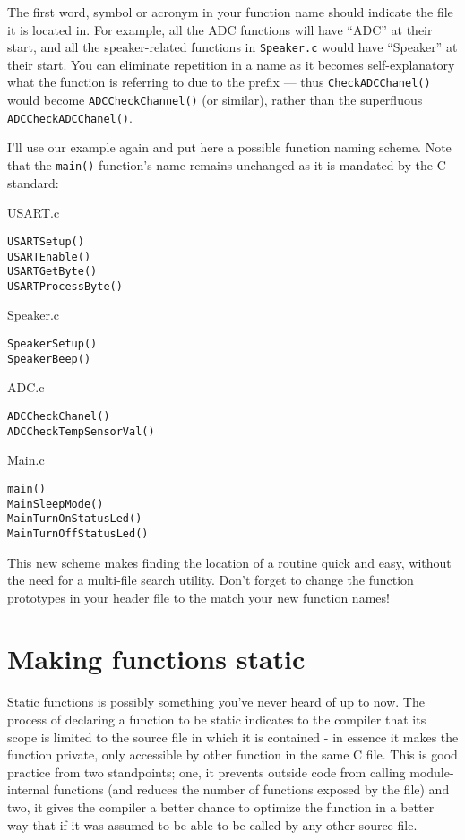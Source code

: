 \documentclass[a4paper,oneside]{book}
\begin{document}
The first word, symbol or acronym in your function name should indicate the file it is located in. For example, all the ADC functions will have ``ADC'' at their start, and all the speaker-related functions in \texttt{Speaker.c} would have ``Speaker'' at their start. You can eliminate repetition in a name as it becomes self-explanatory what the function is referring to due to the prefix --- thus \texttt{CheckADCChanel()} would become \texttt{ADCCheckChannel()} (or similar), rather than the superfluous \texttt{ADCCheckADCChanel()}.

I'll use our example again and put here a possible function naming scheme. Note that the \texttt{main()} function's name remains unchanged as it is mandated by the C standard:

USART.c
\begin{center}
\begin{lstlisting}
USARTSetup()
USARTEnable()
USARTGetByte()
USARTProcessByte()
\end{lstlisting}
\end{center}

Speaker.c
\begin{center}
\begin{lstlisting}
SpeakerSetup()
SpeakerBeep()
\end{lstlisting}
\end{center}

ADC.c
\begin{center}
\begin{lstlisting}
ADCCheckChanel()
ADCCheckTempSensorVal()
\end{lstlisting}
\end{center}

Main.c
\begin{center}
\begin{lstlisting}
main()
MainSleepMode()
MainTurnOnStatusLed()
MainTurnOffStatusLed()
\end{lstlisting}
\end{center}

This new scheme makes finding the location of a routine quick and easy, without the need for a multi-file search utility. Don't forget to change the function prototypes in your header file to the match your new function names!

\section{Making functions static}

Static functions is possibly something you've never heard of up to now. The process of declaring a function to be static indicates to the compiler that its scope is limited to the source file in which it is contained - in essence it makes the function private, only accessible by other function in the same C file. This is good practice from two standpoints; one, it prevents outside code from calling module-internal functions (and reduces the number of functions exposed by the file) and two, it gives the compiler a better chance to optimize the function in a better way that if it was assumed to be able to be called by any other source file.
\end{document}

